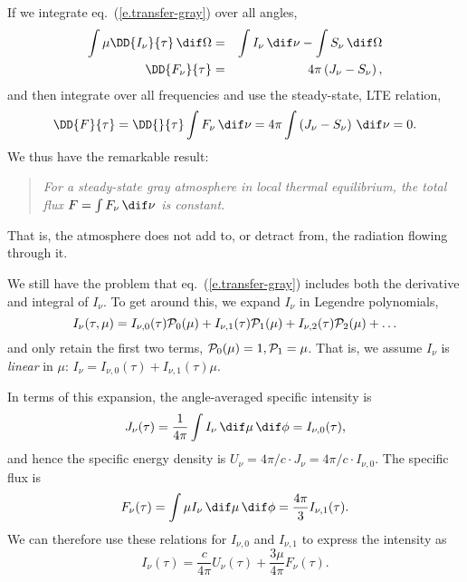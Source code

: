 If we integrate eq.~(\ref{e.transfer-gray}) over all angles,
\begin{eqnarray*}
	\int\mu\DD{I_{\nu}}{\tau}\,\dif\Omega &=& \int I_{\nu}\,\dif\nu -\int S_{\nu}\,\dif\Omega\\
	\DD{F_{\nu}}{\tau} &=& 4\pi \left(J_{\nu} - S_{\nu}\right),
\end{eqnarray*}
and then integrate over all frequencies and use the steady-state, LTE relation,
\[ \DD{F}{\tau} = \DD{}{\tau}\int F_{\nu}\,\dif\nu = 4\pi\int \left(J_{\nu} - S_{\nu}\right)\,\dif\nu = 0.\]
We thus have the remarkable result:
\begin{quote}
\emph{For a steady-state gray atmosphere in local thermal equilibrium, the total flux $F = \int F_{\nu}\,\dif\nu$ is constant.}
\end{quote}
That is, the atmosphere does not add to, or detract from, the radiation flowing through it.

We still have the problem that eq.~(\ref{e.transfer-gray}) includes both the derivative and integral of $I_{\nu}$. To get around this, we expand $I_{\nu}$ in Legendre polynomials,
\[
	I_{\nu}(\tau,\mu) = I_{\nu,0}(\tau)\mathcal{P}_{0}(\mu) + I_{\nu,1}(\tau)\mathcal{P}_{1}(\mu) + I_{\nu,2}(\tau)\mathcal{P}_{2}(\mu) + \ldots
\]
and only retain the first two terms, $\mathcal{P}_{0}(\mu) = 1, \mathcal{P}_{1} = \mu$. That is, we assume $I_{\nu}$ is \emph{linear} in $\mu$: $I_{\nu} = I_{\nu,0}(\tau) + I_{\nu,1}(\tau)\mu$. 

In terms of this expansion, the angle-averaged specific intensity is
\[
	J_{\nu}(\tau) = \frac{1}{4\pi}\int I_{\nu}\,\dif\mu\,\dif\phi = I_{\nu,0}(\tau),
\]
and hence the specific energy density is $U_{\nu} = 4\pi/c\cdot J_{\nu} = 4\pi/c\cdot I_{\nu,0}$. The specific flux is
\[
	F_{\nu}(\tau) = \int \mu I_{\nu}\,\dif\mu\,\dif\phi = \frac{4\pi}{3} I_{\nu,1}(\tau).
\]
We can therefore use these relations for $I_{\nu,0}$ and $I_{\nu,1}$ to express the intensity as
\begin{equation}
\label{e.intensity-expanded}
I_{\nu}(\tau) = \frac{c}{4\pi}U_{\nu}(\tau) + \frac{3\mu}{4\pi} F_{\nu}(\tau).
\end{equation}

